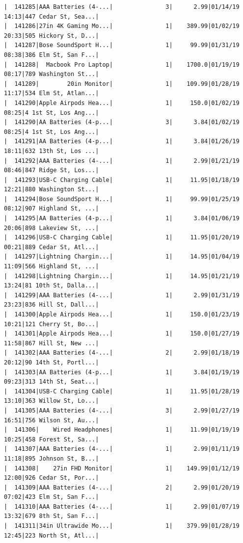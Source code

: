 \documentclass[
  letterpaper,
  DIV=11,
  numbers=noendperiod]{scrartcl}
\begin{document}
\begin{verbatim}
|  141285|AAA Batteries (4-...|               3|      2.99|01/14/19 14:13|447 Cedar St, Sea...|
|  141286|27in 4K Gaming Mo...|               1|    389.99|01/02/19 20:33|505 Hickory St, D...|
|  141287|Bose SoundSport H...|               1|     99.99|01/31/19 08:38|386 Elm St, San F...|
|  141288|  Macbook Pro Laptop|               1|    1700.0|01/19/19 08:17|789 Washington St...|
|  141289|        20in Monitor|               1|    109.99|01/28/19 11:17|534 Elm St, Atlan...|
|  141290|Apple Airpods Hea...|               1|     150.0|01/02/19 08:25|4 1st St, Los Ang...|
|  141290|AA Batteries (4-p...|               3|      3.84|01/02/19 08:25|4 1st St, Los Ang...|
|  141291|AA Batteries (4-p...|               1|      3.84|01/26/19 18:11|632 13th St, Los ...|
|  141292|AAA Batteries (4-...|               1|      2.99|01/21/19 08:46|847 Ridge St, Los...|
|  141293|USB-C Charging Cable|               1|     11.95|01/18/19 12:21|880 Washington St...|
|  141294|Bose SoundSport H...|               1|     99.99|01/25/19 08:12|907 Highland St, ...|
|  141295|AA Batteries (4-p...|               1|      3.84|01/06/19 20:06|898 Lakeview St, ...|
|  141296|USB-C Charging Cable|               1|     11.95|01/20/19 00:21|889 Cedar St, Atl...|
|  141297|Lightning Chargin...|               1|     14.95|01/04/19 11:09|566 Highland St, ...|
|  141298|Lightning Chargin...|               1|     14.95|01/21/19 13:24|81 10th St, Dalla...|
|  141299|AAA Batteries (4-...|               1|      2.99|01/31/19 23:23|836 Hill St, Dall...|
|  141300|Apple Airpods Hea...|               1|     150.0|01/23/19 10:21|121 Cherry St, Bo...|
|  141301|Apple Airpods Hea...|               1|     150.0|01/27/19 11:58|867 Hill St, New ...|
|  141302|AAA Batteries (4-...|               2|      2.99|01/18/19 20:12|90 14th St, Portl...|
|  141303|AA Batteries (4-p...|               1|      3.84|01/19/19 09:23|313 14th St, Seat...|
|  141304|USB-C Charging Cable|               1|     11.95|01/28/19 13:10|363 Willow St, Lo...|
|  141305|AAA Batteries (4-...|               3|      2.99|01/27/19 16:51|756 Wilson St, Au...|
|  141306|    Wired Headphones|               1|     11.99|01/19/19 10:25|458 Forest St, Sa...|
|  141307|AAA Batteries (4-...|               1|      2.99|01/11/19 11:18|895 Johnson St, B...|
|  141308|    27in FHD Monitor|               1|    149.99|01/12/19 12:00|926 Cedar St, Por...|
|  141309|AAA Batteries (4-...|               2|      2.99|01/20/19 07:02|423 Elm St, San F...|
|  141310|AAA Batteries (4-...|               1|      2.99|01/07/19 13:32|679 8th St, San F...|
|  141311|34in Ultrawide Mo...|               1|    379.99|01/28/19 12:45|223 North St, Atl...|

\end{verbatim}
\end{document}
